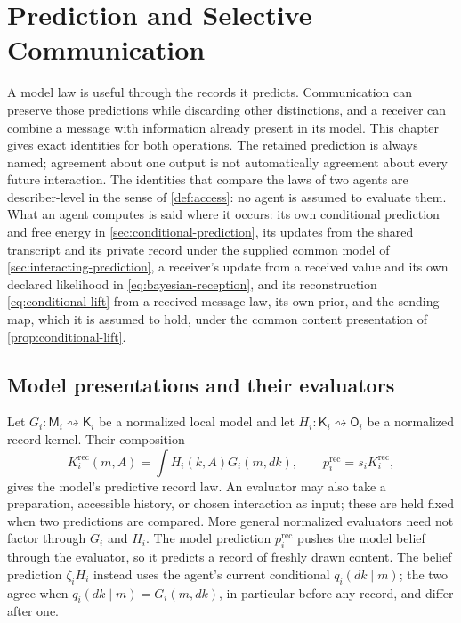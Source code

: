 \chapter{Prediction and Selective Communication}
\label{ch:prediction}

A model law is useful through the records it predicts. Communication can preserve those predictions while discarding other distinctions, and a receiver can combine a message with information already present in its model. This chapter gives exact identities for both operations. The retained prediction is always named; agreement about one output is not automatically agreement about every future interaction. The identities that compare the laws of two agents are describer-level in the sense of \cref{def:access}: no agent is assumed to evaluate them. What an agent computes is said where it occurs: its own conditional prediction and free energy in \cref{sec:conditional-prediction}, its updates from the shared transcript and its private record under the supplied common model of \cref{sec:interacting-prediction}, a receiver's update from a received value and its own declared likelihood in \cref{eq:bayesian-reception}, and its reconstruction \cref{eq:conditional-lift} from a received message law, its own prior, and the sending map, which it is assumed to hold, under the common content presentation of \cref{prop:conditional-lift}.

\section{Model presentations and their evaluators}

Let $G_i:\mathsf M_i\rightsquigarrow\mathsf K_i$ be a normalized local model and let $H_i:\mathsf K_i\rightsquigarrow\mathsf O_i$ be a normalized record kernel. Their composition
\begin{equation}
K_i^{\mathrm{rec}}(m,A)=\int H_i(k,A)G_i(m,dk),
\qquad p_i^{\mathrm{rec}}=s_iK_i^{\mathrm{rec}},
\label{eq:predictive-evaluator}
\end{equation}
gives the model's predictive record law. An evaluator may also take a preparation, accessible history, or chosen interaction as input; these are held fixed when two predictions are compared. More general normalized evaluators need not factor through $G_i$ and $H_i$. The model prediction $p_i^{\mathrm{rec}}$ pushes the model belief through the evaluator, so it predicts a record of freshly drawn content. The belief prediction $\zeta_iH_i$ instead uses the agent's current conditional $q_i(dk\mid m)$; the two agree when $q_i(dk\mid m)=G_i(m,dk)$, in particular before any record, and differ after one.

